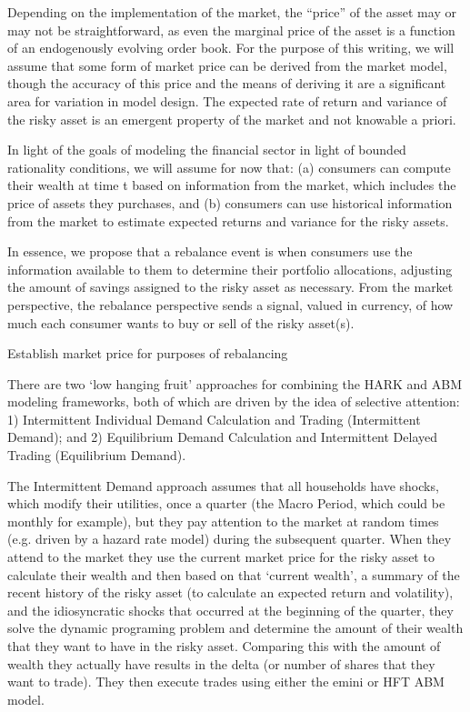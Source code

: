 Depending on the implementation of the market, the “price” of the asset
may or may not be straightforward, as even the marginal price of the asset
is a function of an endogenously evolving order book. For the purpose of
this writing, we will assume that some form of market price can be derived
from the market model, though the accuracy of this price and the means of
deriving it are a significant area for variation in model design.
The expected rate of return and variance of the risky asset is an emergent
property of the market and not knowable a priori.

In light of the goals of modeling the financial sector in light of bounded
rationality conditions, we will assume for now that: (a) consumers can
compute their wealth at time t based on information from the market, which
includes the price of assets they purchases, and (b) consumers can use
historical information from the market to estimate expected returns and
variance for the risky assets.

In essence, we propose that a rebalance event is when consumers use the
information available to them to determine their portfolio allocations,
adjusting the amount of savings assigned to the risky asset as necessary.
From the market perspective, the rebalance perspective sends a signal,
valued in currency, of how much each consumer wants to buy or sell of the risky asset(s).

Establish market price for purposes of rebalancing

There are two ‘low hanging fruit’ approaches for combining the HARK and ABM
modeling frameworks, both of which are driven by the idea of selective
attention: 1) Intermittent Individual Demand Calculation and Trading
(Intermittent Demand); and 2) Equilibrium Demand Calculation and Intermittent
Delayed Trading (Equilibrium Demand). 

The Intermittent Demand approach assumes that all households have shocks,
which modify their utilities, once a quarter (the Macro Period, which could
be monthly for example), but they  pay attention to the market at random
times (e.g. driven by a hazard rate model) during the subsequent quarter.
When they attend to the market they use the current market price for the
risky asset to calculate their wealth and then based on that ‘current wealth’,
a summary of the recent history of the risky asset (to calculate an expected
return and volatility), and the idiosyncratic shocks that occurred at the
beginning of the quarter, they solve the dynamic programing problem and
determine the amount of their wealth that they want to have in the risky
asset. Comparing this with the amount of wealth they actually have results
in the delta (or number of shares that they want to trade). They then
execute trades using either the emini or HFT ABM model.

